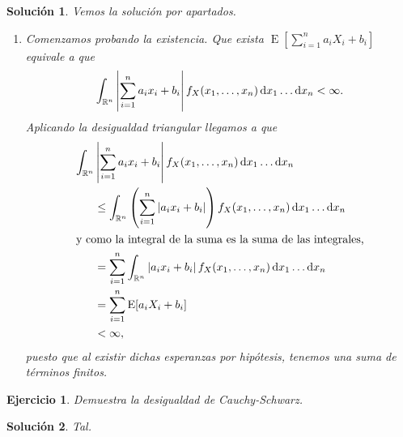 \documentclass[
  a4paper,
  spanish,
  12pt,
]{scrartcl}
\theoremstyle{ejercicio-style}
\newtheorem{ejer}{Ejercicio}
\theoremstyle{remark-style}
\newtheorem*{sol}{Solución}
\begin{document}
\begin{sol}
  Vemos la solución por apartados. \begin{enumerate}
    \item Comenzamos probando la existencia. Que exista \(\operatorname{E}\left[\sum_{i=1}^n a_iX_i + b_i\right]\) equivale a que \[
      \int_{\mathbb R^n}\left|\sum_{i=1}^n a_ix_i + b_i\right| f_X(x_1, \dots, x_n)\dif x_1\dots\dif x_n < \infty.
    \] Aplicando la desigualdad triangular llegamos a que \begin{align*}
      \int_{\mathbb R^n}&\left|\sum_{i=1}^n a_ix_i + b_i\right| f_X(x_1, \dots, x_n)\dif x_1\dots\dif x_n\\
        &\leq \int_{\mathbb R^n}\left(\sum_{i=1}^n \left|a_ix_i + b_i\right|\right) f_X(x_1, \dots, x_n)\dif x_1\dots\dif x_n\\
        \intertext{y como la integral de la suma es la suma de las integrales,}
        &= \sum_{i=1}^n\int_{\mathbb R^n}\left|a_ix_i + b_i\right| f_X(x_1, \dots, x_n)\dif x_1\dots\dif x_n\\
        &= \sum_{i=1}^n \operatorname{E}[a_iX_i + b_i]\\
        &< \infty,
    \end{align*} puesto que al existir dichas esperanzas por hipótesis, tenemos una suma de términos finitos.
  \end{enumerate}
\end{sol}

\begin{ejer}
  Demuestra la desigualdad de Cauchy-Schwarz.
\end{ejer}

\begin{sol}
  Tal.
\end{sol}
\end{document}
